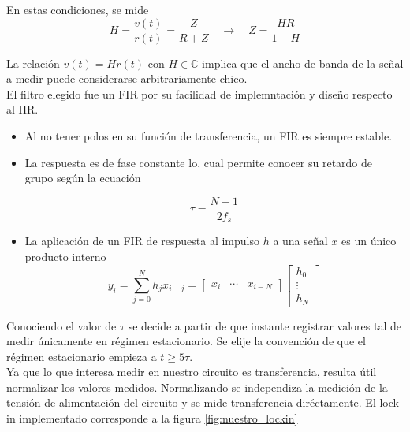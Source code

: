 \documentclass[11pt,a4paper]{extarticle}
\begin{document}
\begin{multicols}{2}
En estas condiciones, se mide 
\begin{equation}
	H = \frac{v(t)}{r(t)} = \frac{Z}{R + Z} \quad \longrightarrow \quad Z =  \frac{HR}{1-H}	
\end{equation}

La relación $v(t) = H r(t)$ con $H \in \mathbb C$ implica que el ancho de banda de la señal a medir puede considerarse arbitrariamente chico.\\

El filtro elegido fue un FIR por su facilidad de implemntación y diseño respecto al IIR.\cite{haykin_8}
\begin{itemize}
	\item Al no tener polos en su función de transferencia, un FIR es siempre estable.
	\item La respuesta es de fase constante lo, cual permite conocer su retardo de grupo según la ecuación

	\begin{equation}\label{eq:tau}
		\tau = \frac{N-1}{2f_s}
	\end{equation}
	\item La aplicación de un FIR de respuesta al impulso $h$ a una señal $x$ es un único producto interno
	\begin{equation}\label{eq:fir}
		y_i = \sum_{j=0}^N h_jx_{i-j}= 
		\begin{bmatrix}
			x_i & \cdots & x_{i-N}
		\end{bmatrix}
		\begin{bmatrix}
			h_0 \\ \vdots \\ h_N	
		\end{bmatrix}
	\end{equation}
\end{itemize} 


Conociendo el valor de $\tau$ se decide a partir de que instante registrar valores tal de medir únicamente en régimen estacionario. Se elije la convención de que el régimen estacionario empieza a $t \ge 5\tau$.\\


Ya que lo que interesa medir en nuestro circuito es transferencia, resulta útil normalizar los valores medidos. Normalizando se independiza la medición de la tensión de alimentación del circuito y se mide transferencia diréctamente. El lock in implementado corresponde a la figura \ref{fig:nuestro_lockin}


\end{multicols}
\end{document}
